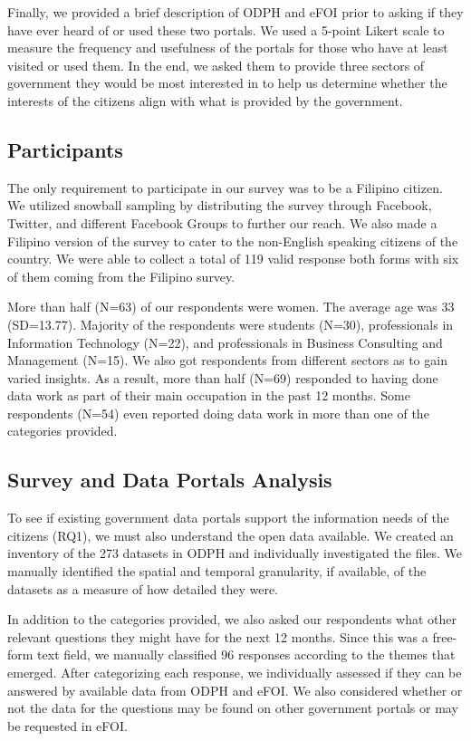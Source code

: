 \documentclass{sigchi}
\begin{document}
Finally, we provided a brief description of ODPH and eFOI prior to asking if they have ever heard of or used these two portals. We used a 5-point Likert scale to measure the frequency and usefulness of the portals for those who have at least visited or used them. In the end, we asked them to provide three sectors of government they would be most interested in to help us determine whether the interests of the citizens align with what is provided by the government.

\subsection{Participants}
The only requirement to participate in our survey was to be a Filipino citizen. We utilized snowball sampling by distributing the survey through Facebook, Twitter, and different Facebook Groups to further our reach. We also made a Filipino version of the survey to cater to the non-English speaking citizens of the country. We were able to collect a total of 119 valid response both forms with six of them coming from the Filipino survey.

More than half (N=63) of our respondents were women. The average age was 33 (SD=13.77). Majority of the respondents were students (N=30), professionals in Information Technology (N=22), and professionals in Business Consulting and Management (N=15). We also got respondents from different sectors as to gain varied insights. As a result, more than half (N=69) responded to having done data work as part of their main occupation in the past 12 months. Some respondents (N=54) even reported doing data work in more than one of the categories provided.

\subsection{Survey and Data Portals Analysis}
To see if existing government data portals support the information needs of the citizens (RQ1), we must also understand the open data available. We created an inventory of the 273 datasets in ODPH and individually investigated the files. We manually identified the spatial and temporal granularity, if available, of the datasets as a measure of how detailed they were.

In addition to the categories provided, we also asked our respondents what other relevant questions they might have for the next 12 months. Since this was a free-form text field, we manually classified 96 responses according to the themes that emerged. After categorizing each response, we individually assessed if they can be answered by available data from ODPH and eFOI. We also considered whether or not the data for the questions may be found on other government portals or may be requested in eFOI.
\end{document}
